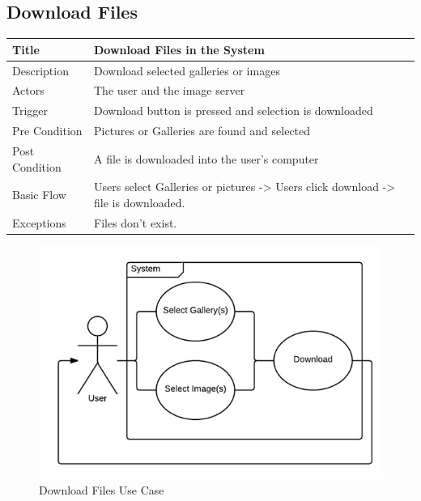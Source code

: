 \newpage

\subsection{Download Files}
  \begin{table}[h!]
    \begin{tabularx}{\textwidth}{|l|X|}
      \hline
      Title       & Download Files in the System \\ \hline
      Description & Download selected galleries or images\\ \hline
      Actors & The user and the image server\\ \hline
      Trigger & Download button is pressed and selection is downloaded\\ \hline
      Pre Condition & Pictures or Galleries are found and selected\\ \hline
      Post Condition & A file is downloaded into the user’s computer\\ \hline
      Basic Flow & Users select Galleries or pictures -> Users click download -> file is downloaded.  \\ \hline
      Exceptions    &   Files don't exist. \\ \hline
    \end{tabularx}
  \end{table}

\begin{figure}[h!]
  \begin{center}
    \caption{Download Files Use Case}
    \label{}
    \includegraphics[width=\textwidth]{images/DownloadFilesUC.jpg}
  \end{center}
\end{figure}


